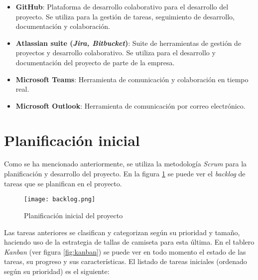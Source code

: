 \begin{itemize}
	\item \textbf{GitHub}: Plataforma de desarrollo colaborativo para el
		desarrollo del proyecto. Se utiliza para la gestión de tareas,
		seguimiento de desarrollo, documentación y colaboración.
	\item \textbf{Atlassian suite (\emph{Jira, Bitbucket})}: Suite de
		herramientas de gestión de proyectos y desarrollo colaborativo. Se
		utiliza para el desarrollo y documentación del proyecto de parte de la
		empresa.
	\item \textbf{Microsoft Teams}: Herramienta de comunicación y colaboración
		en tiempo real.
	\item \textbf{Microsoft Outlook}: Herramienta de comunicación por correo
		electrónico.
\end{itemize}

\newpage{}
\section{Planificación inicial}\label{sec:planif_inicial}
Como se ha mencionado anteriormente, se utiliza la metodología \textit{Scrum}
para la planificación y desarrollo del proyecto. En la figura \ref{fig:backlog}
se puede ver el \textit{backlog} de tareas que se planifican en el proyecto.

\begin{figure}[H]
	\centering
	\texttt{[image: backlog.png]}
	\caption{Planificación inicial del proyecto}
	\label{fig:backlog}
\end{figure}

Las tareas anteriores se clasifican y categorizan según su prioridad y tamaño,
haciendo uso de la estrategia de tallas de camiseta para esta última. En el
tablero \textit{Kanban} (ver figura \ref{fig:kanban}) se puede ver en todo
momento el estado de las tareas, su progreso y sus características. El listado
de tareas iniciales (ordenado según su prioridad) es el siguiente:

